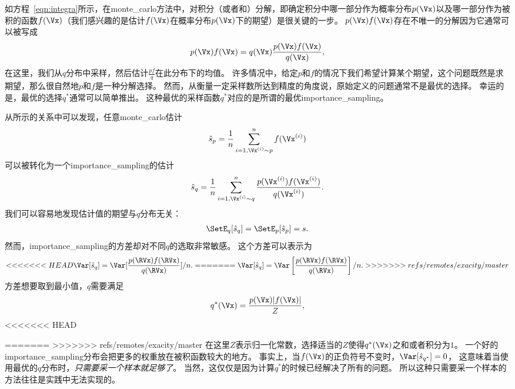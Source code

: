如方程~\eqref{eqn:integra}所示，在\gls{monte_carlo}方法中，对积分（或者和）分解，即确定积分中哪一部分作为概率分布$p(\Vx)$以及哪一部分作为被积的函数$f(\Vx)$（我们感兴趣的是估计$f(\Vx)$在概率分布$p(\Vx)$下的期望）是很关键的一步。
$p(\Vx)f(\Vx)$存在不唯一的分解因为它通常可以被写成
\begin{align}
\label{eqn:decomposition}
p(\Vx)f(\Vx) = q(\Vx) \frac{p(\Vx)f(\Vx)}{q(\Vx)},
\end{align}
在这里，我们从$q$分布中采样，然后估计$\frac{pf}{q}$在此分布下的均值。
许多情况中，给定$p$和$f$的情况下我们希望计算某个期望，这个问题既然是求期望，那么很自然地$p$和$f$是一种分解选择。
然而，从衡量一定采样数所达到精度的角度说，原始定义的问题通常不是最优的选择。
幸运的是，最优的选择$q^*$通常可以简单推出。
这种最优的采样函数$q^*$对应的是所谓的最优\gls{importance_sampling}。


从所示的关系中可以发现，任意\gls{monte_carlo}估计
\begin{align}
\hat{s}_p = \frac{1}{n}\sum_{i=1,\Vx^{(i)}\sim p}^{n}f(\Vx^{(i)})
\end{align}
可以被转化为一个\gls{importance_sampling}的估计
\begin{align}
\hat{s}_q = \frac{1}{n}\sum_{i=1,\Vx^{(i)}\sim q}^{n}\frac{p(\Vx^{(i)})f(\Vx^{(i)})}{q(\Vx^{(i)})}.
\end{align}
我们可以容易地发现估计值的期望与$q$分布无关：
\begin{align}
\SetE_q [\hat{s}_q] = \SetE_p [\hat{s}_p] = s.
\end{align}
然而，\gls{importance_sampling}的方差却对不同$q$的选取非常敏感。
这个方差可以表示为
\begin{align}
\label{eqn:variance_of_is}
<<<<<<< HEAD
\Var [\hat{s}_q] = \Var [\frac{p(\RVx)f(\RVx)}{q(\RVx)}]/n.
=======
\Var [\hat{s}_q] = \Var \left[\frac{p(\RVx)f(\RVx)}{q(\RVx)}\right]/n.
>>>>>>> refs/remotes/exacity/master
\end{align}
方差想要取到最小值，$q$需要满足
\begin{align}
q^*(\Vx) = \frac{p(\Vx)\vert f(\Vx)\vert}{Z},
\end{align}
<<<<<<< HEAD


=======
>>>>>>> refs/remotes/exacity/master
在这里$Z$表示归一化常数，选择适当的$Z$使得$q^*(\Vx)$之和或者积分为$1$。
一个好的\gls{importance_sampling}分布会把更多的权重放在被积函数较大的地方。
事实上，当$f(\Vx)$的正负符号不变时，$\Var[\hat{s}_{q^*}]=0$， 这意味着当使用最优的$q$分布时，\emph{只需要采一个样本就足够了}。
当然，这仅仅是因为计算$q^*$的时候已经解决了所有的问题。
所以这种只需要采一个样本的方法往往是实践中无法实现的。


